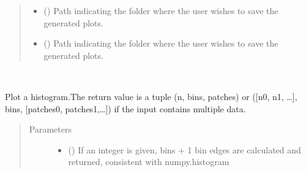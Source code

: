 \documentclass[letterpaper,10pt,english,openany, oneside]{sphinxmanual}
\begin{document}
\begin{fulllineitems}
\begin{fulllineitems}
\begin{quote}
\begin{description}
\begin{itemize}
\item {} 
 (\sphinxstyleliteralemphasis{\sphinxupquote{, }}) \textendash{} Path indicating the folder where the user wishes to save the generated plots.

\item {} 
 (\sphinxstyleliteralemphasis{\sphinxupquote{, }}) \textendash{} Path indicating the folder where the user wishes to save the generated plots.

\end{itemize}

\end{description}\end{quote}

\end{fulllineitems}


\begin{fulllineitems}
\label{\detokenize{index:fompy.plots.plotter.hist}}~

\begin{fulllineitems}
Plot a histogram.The return value is a tuple (n, bins, patches) or ({[}n0, n1, …{]},
bins, {[}patches0, patches1,…{]}) if the input contains multiple data.

\end{fulllineitems}

\begin{quote}\begin{description}
\item[{Parameters}] \leavevmode\begin{itemize}
\item {} 
 () \textendash{} If an integer is given, bins + 1 bin edges are calculated and returned, consistent with
numpy.histogram


\end{itemize}
\end{description}
\end{quote}
\end{fulllineitems}
\end{fulllineitems}
\end{document}
